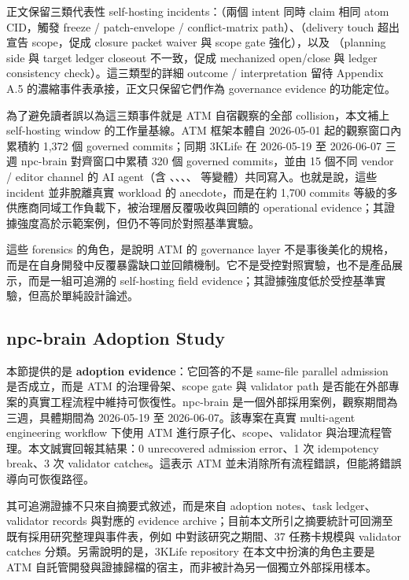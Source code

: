 \documentclass[a4paper,fontset=none]{ctexart}
\begin{document}
正文保留三類代表性 self-hosting incidents：\texttt{}（兩個 intent 同時 claim 相同 atom CID，觸發 freeze / patch-envelope / conflict-matrix path）、\texttt{}（delivery touch 超出宣告 scope，促成 closure packet waiver 與 scope gate 強化），以及 \texttt{}（planning side 與 target ledger closeout 不一致，促成 mechanized open/close 與 ledger consistency check）。這三類型的詳細 outcome / interpretation 留待 Appendix A.5 的濃縮事件表承接，正文只保留它們作為 governance evidence 的功能定位。

為了避免讀者誤以為這三類事件就是 ATM 自宿觀察的全部 collision，本文補上 self-hosting window 的工作量基線。ATM 框架本體自 2026-05-01 起的觀察窗口內累積約 1,372 個 governed commits；同期 3KLife 在 2026-05-19 至 2026-06-07 三週 npc-brain 對齊窗口中累積 320 個 governed commits，並由 15 個不同 vendor / editor channel 的 AI agent（含 \texttt{}、\texttt{}、\texttt{}、\texttt{}、\texttt{} 等變體）共同寫入。也就是說，這些 incident 並非脫離真實 workload 的 anecdote，而是在約 1,700 commits 等級的多供應商同域工作負載下，被治理層反覆吸收與回饋的 operational evidence；其證據強度高於示範案例，但仍不等同於對照基準實驗。

這些 forensics 的角色，是說明 ATM 的 governance layer 不是事後美化的規格，而是在自身開發中反覆暴露缺口並回饋機制。它不是受控對照實驗，也不是產品展示，而是一組可追溯的 self-hosting field evidence；其證據強度低於受控基準實驗，但高於單純設計論述。

\subsection{npc-brain Adoption Study}

本節提供的是 \textbf{adoption evidence}：它回答的不是 same-file parallel admission 是否成立，而是 ATM 的治理骨架、scope gate 與 validator path 是否能在外部專案的真實工程流程中維持可恢復性。npc-brain 是一個外部採用案例，觀察期間為三週，具體期間為 2026-05-19 至 2026-06-07。該專案在真實 multi-agent engineering workflow 下使用 ATM 進行原子化、scope、validator 與治理流程管理。本文誠實回報其結果：0 unrecovered admission error、1 次 idempotency break、3 次 validator catches。這表示 ATM 並未消除所有流程錯誤，但能將錯誤導向可恢復路徑。

其可追溯證據不只來自摘要式敘述，而是來自 adoption notes、task ledger、validator records 與對應的 evidence archive；目前本文所引之摘要統計可回溯至既有採用研究整理與事件表，例如 \texttt{} 中對該研究之期間、37 任務卡規模與 validator catches 分類。另需說明的是，3KLife repository 在本文中扮演的角色主要是 ATM 自託管開發與證據歸檔的宿主，而非被計為另一個獨立外部採用樣本。
\end{document}
